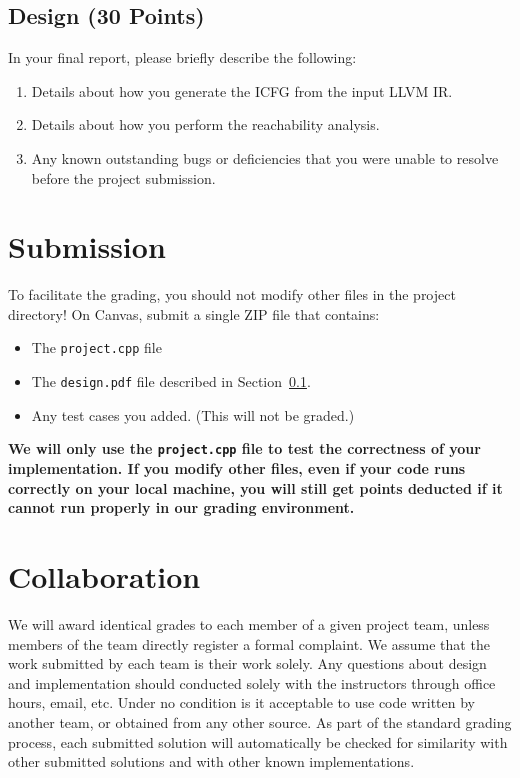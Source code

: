 \documentclass[12pt]{article}
\newcommand{\codeIn}[1]{{\small\tt{#1}}}
\newcommand{\implementationFile}{\codeIn{project.cpp} }
\begin{document}
\subsection{Design (30 Points)}\label{sec:design}

In your final report, 
please briefly describe the following:
%
\begin{enumerate}
\item Details about how you generate the ICFG from the input LLVM IR.
\item Details about how you perform the reachability analysis.
\item Any known outstanding bugs or deficiencies that you were unable
  to   resolve before the project submission.
 \end{enumerate}

\section{Submission}\label{sec:sub}
To facilitate the grading, you should not modify
other files in the project directory!
On Canvas, submit a single ZIP file that contains:
\begin{itemize}
    \item The \implementationFile file
    \item The \codeIn{design.pdf} file described in Section~\ref{sec:design}.
    \item Any test cases you added. (This will not be graded.)
\end{itemize}
\textbf{We will only use the \implementationFile file to test the correctness of your implementation. If you modify other files, even if your code runs correctly on your local machine,
you will still get points deducted if it cannot run properly in our grading environment.}

\section{Collaboration}
%
We will award identical grades to each member of a given project team,
unless members of the team directly register a formal complaint.
%
We assume that the work submitted by each team is their work solely.
% 
Any questions about design and implementation should conducted solely with the instructors through office hours, email, etc.
%
Under no condition is it acceptable to use code written by another
team, or obtained from any other source.
%
As part of the standard grading process, each submitted solution will
automatically be checked for similarity with other submitted solutions and with other known
implementations.
\end{document}
